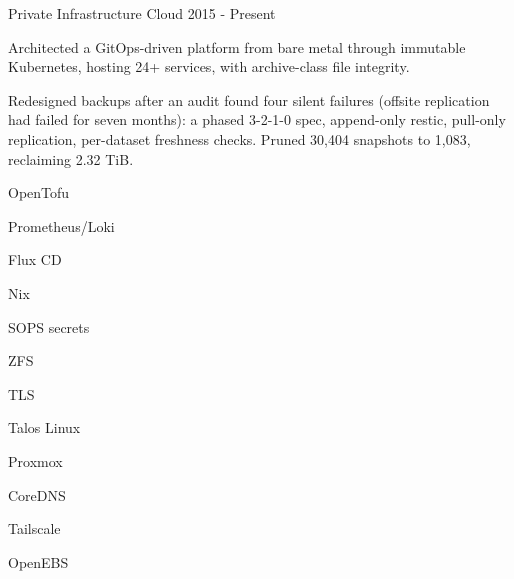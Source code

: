 \begin{cventries}
  \cventry%
  {} %
  {Private Infrastructure Cloud} %
  {} %
  {2015 \-- Present} %
  {%
    \begin{cvitems}
    \item {Architected a GitOps-driven platform from bare metal through immutable Kubernetes, hosting 24+ services, with archive-class file integrity.}
    \item {Redesigned backups after an audit found four silent failures (offsite replication had failed for seven months): a phased 3-2-1-0 spec, append-only restic, pull-only replication, per-dataset freshness checks. Pruned 30,404 snapshots to 1,083, reclaiming 2.32 TiB.}
    \end{cvitems}
  }
  \begin{cventryskills}
  \item OpenTofu
  \item Prometheus/Loki
  \item Flux CD
  \item Nix
  \item SOPS secrets
  \item ZFS
  \item TLS
  \item Talos Linux
  \item Proxmox
  \item CoreDNS
  \item Tailscale
  \item OpenEBS
  \end{cventryskills}

\end{cventries}
